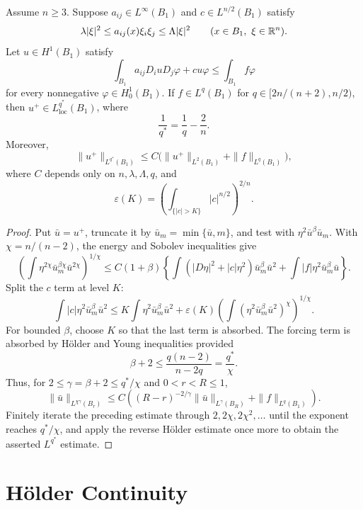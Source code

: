 \begin{theorem}\label{hanlin:weaksol-part2-high-integrability}
Assume $n\geq3$. Suppose $a_{ij}\in L^\infty(B_1)$ and
$c\in L^{n/2}(B_1)$ satisfy
\[
\lambda|\xi|^2\leq a_{ij}(x)\xi_i\xi_j\leq\Lambda|\xi|^2
\qquad(x\in B_1,\ \xi\in\mathbb{R}^n).
\]
Let $u\in H^1(B_1)$ satisfy
\[
\int_{B_1}a_{ij}D_i uD_j\varphi+cu\varphi
\leq\int_{B_1}f\varphi
\]
for every nonnegative $\varphi\in H^1_0(B_1)$. If
$f\in L^q(B_1)$ for
$q\in[2n/(n+2),n/2)$, then
$u^+\in L^{q^*}_{\mathrm{loc}}(B_1)$, where
\[
\frac1{q^*}=\frac1q-\frac2n.
\]
Moreover,
\[
\|u^+\|_{L^{q^*}(B_1)}
\leq C\bigl(\|u^+\|_{L^2(B_1)}+\|f\|_{L^q(B_1)}\bigr),
\]
where $C$ depends only on $n,\lambda,\Lambda,q$, and
\[
\varepsilon(K)=
\left(\int_{\{|c|>K\}}|c|^{n/2}\right)^{2/n}.
\]
\end{theorem}
\begin{proof}
\sketch Put $\bar u=u^+$, truncate it by
$\bar u_m=\min\{\bar u,m\}$, and test with
$\eta^2\bar u^\beta\bar u_m$. With $\chi=n/(n-2)$, the energy and Sobolev
inequalities give
\[
\left(\int\eta^{2\chi}\bar u_m^{\beta\chi}\bar u^{2\chi}
\right)^{1/\chi}
\leq C(1+\beta)\left\{
\int(|D\eta|^2+|c|\eta^2)\bar u_m^\beta\bar u^2
+\int|f|\eta^2\bar u_m^\beta\bar u\right\}.
\]
Split the $c$ term at level $K$:
\[
\int|c|\eta^2\bar u_m^\beta\bar u^2
\leq K\int\eta^2\bar u_m^\beta\bar u^2
+\varepsilon(K)
\left(\int(\eta^2\bar u_m^\beta\bar u^2)^\chi\right)^{1/\chi}.
\]
For bounded $\beta$, choose $K$ so that the last term is absorbed. The
forcing term is absorbed by H\"older and Young inequalities provided
\[
\beta+2\leq\frac{q(n-2)}{n-2q}=\frac{q^*}{\chi}.
\]
Thus, for $2\leq\gamma=\beta+2\leq q^*/\chi$ and $0<r<R\leq1$,
\begin{equation}
\|\bar u\|_{L^{\chi\gamma}(B_r)}
\leq C\left((R-r)^{-2/\gamma}
\|\bar u\|_{L^\gamma(B_R)}+\|f\|_{L^q(B_1)}\right).
\end{equation}
Finitely iterate the preceding estimate through $2,2\chi,2\chi^2,\ldots$
until the exponent
reaches $q^*/\chi$, and apply the reverse H\"older estimate once more to
obtain the asserted
$L^{q^*}$ estimate.
\end{proof}

\section{H\"older Continuity}

